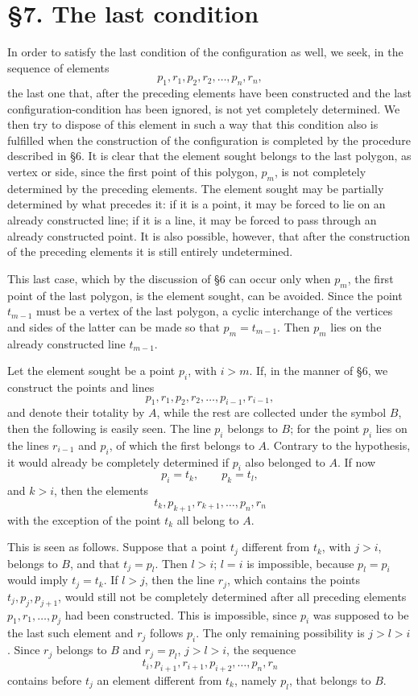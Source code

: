 \documentclass[11pt]{article}
\begin{document}
\section*{\S 7. The last condition}
In order to satisfy the last condition of the configuration as well, we seek, in the sequence of elements
\[
p_1,r_1,p_2,r_2,\ldots,p_n,r_n,
\]
the last one that, after the preceding elements have been constructed and the last configuration-condition has been ignored, is not yet completely determined. We then try to dispose of this element in such a way that this condition also is fulfilled when the construction of the configuration is completed by the procedure described in \S 6. It is clear that the element sought belongs to the last polygon, as vertex or side, since the first point of this polygon, $p_m$, is not completely determined by the preceding elements. The element sought may be partially determined by what precedes it: if it is a point, it may be forced to lie on an already constructed line; if it is a line, it may be forced to pass through an already constructed point. It is also possible, however, that after the construction of the preceding elements it is still entirely undetermined.

This last case, which by the discussion of \S 6 can occur only when $p_m$, the first point of the last polygon, is the element sought, can be avoided. Since the point $t_{m-1}$ must be a vertex of the last polygon, a cyclic interchange of the vertices and sides of the latter can be made so that $p_m=t_{m-1}$. Then $p_m$ lies on the already constructed line $t_{m-1}$.

Let the element sought be a point $p_i$, with $i>m$. If, in the manner of \S 6, we construct the points and lines
\[
p_1,r_1,p_2,r_2,\ldots,p_{i-1},r_{i-1},
\]
and denote their totality by $A$, while the rest are collected under the symbol $B$, then the following is easily seen. The line $p_i$ belongs to $B$; for the point $p_i$ lies on the lines $r_{i-1}$ and $p_i$, of which the first belongs to $A$. Contrary to the hypothesis, it would already be completely determined if $p_i$ also belonged to $A$. If now
\[
p_i=t_k,\qquad p_k=t_l,
\]
and $k>i$, then the elements
\[
t_k,p_{k+1},r_{k+1},\ldots,p_n,r_n
\]
with the exception of the point $t_k$ all belong to $A$.

This is seen as follows. Suppose that a point $t_j$ different from $t_k$, with $j>i$, belongs to $B$, and that $t_j=p_l$. Then $l>i$; $l=i$ is impossible, because $p_l=p_i$ would imply $t_j=t_k$. If $l>j$, then the line $r_j$, which contains the points $t_j,p_j,p_{j+1}$, would still not be completely determined after all preceding elements $p_1,r_1,\ldots,p_j$ had been constructed. This is impossible, since $p_i$ was supposed to be the last such element and $r_j$ follows $p_i$. The only remaining possibility is $j>l>i$. Since $r_j$ belongs to $B$ and $r_j=p_l$, $j>l>i$, the sequence
\[
t_i,p_{i+1},r_{i+1},p_{i+2},\ldots,p_n,r_n
\]
contains before $t_j$ an element different from $t_k$, namely $p_l$, that belongs to $B$.
\end{document}
